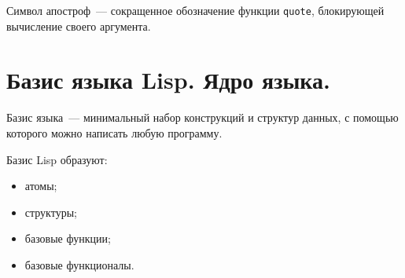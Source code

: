 Символ апостроф~--- сокращенное обозначение функции \texttt{quote}, блокирующей вычисление своего аргумента.

\section{Базис языка Lisp. Ядро языка.}

Базис языка~--- минимальный набор конструкций и структур данных, с помощью которого можно написать любую программу.

Базис Lisp образуют:
\begin{itemize}
	\item атомы;
	\item структуры;
	\item базовые функции;
	\item базовые функционалы.
\end{itemize}
